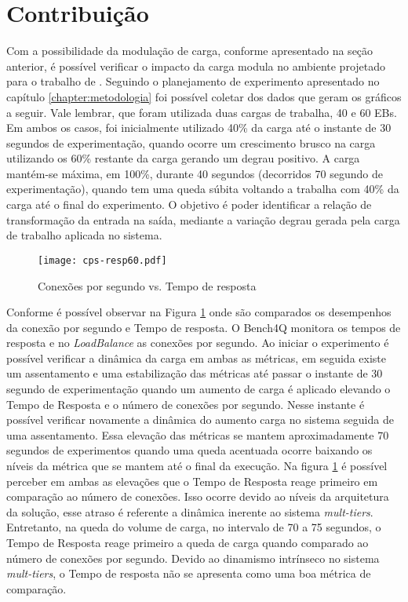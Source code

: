\section{Contribuição}
Com a possibilidade da modulação de carga, conforme apresentado na seção anterior, é possível verificar o impacto da carga modula no ambiente projetado para o trabalho de . Seguindo o planejamento de experimento apresentado no capítulo \ref{chapter:metodologia} foi possível coletar dos dados que geram os gráficos a seguir.
Vale lembrar, que foram utilizada duas cargas de trabalha, 40 e 60 EBs. Em ambos os casos, foi inicialmente utilizado 40\% da carga até o instante de 30 segundos de experimentação, quando ocorre um crescimento brusco na carga utilizando os 60\% restante da carga gerando um degrau positivo. A carga mantém-se máxima, em 100\%, durante 40 segundos (decorridos 70 segundo de experimentação), quando tem uma queda súbita voltando a trabalha com 40\% da carga até o final do experimento. O objetivo é poder identificar a relação de transformação da entrada na saída, mediante a variação degrau gerada pela carga de trabalho aplicada no sistema.

\begin{figure}[htb]
	\centering
	\texttt{[image: cps-resp60.pdf]}	
	\caption{Conexões por segundo vs. Tempo de resposta}
	\label{fig:cps-resp60}
	\fdadospesquisa
\end{figure}

Conforme é possível observar na Figura \ref{fig:cps-resp60} onde são comparados os desempenhos da conexão por segundo e Tempo de resposta. O Bench4Q monitora os tempos de resposta e no \textit{LoadBalance} as conexões por segundo. Ao iniciar o experimento é possível verificar a dinâmica da carga em ambas as métricas, em seguida existe um assentamento e uma estabilização das métricas até passar o instante de 30 segundo de experimentação quando um aumento de carga é aplicado elevando o Tempo de Resposta e o número de conexões por segundo. Nesse instante é possível verificar novamente a dinâmica do aumento carga no sistema seguida de uma assentamento. Essa elevação das métricas se mantem aproximadamente 70 segundos de experimentos quando uma queda acentuada ocorre baixando os níveis da métrica que se mantem até o final da execução. 
Na figura \ref{fig:cps-resp60} é possível perceber em ambas as elevações que o Tempo de Resposta reage primeiro em comparação ao número de conexões. Isso ocorre devido ao níveis da arquitetura da solução, esse atraso é referente a dinâmica inerente ao sistema \textit{mult-tiers}. Entretanto, na queda do volume de carga, no intervalo de 70 a 75 segundos, o Tempo de Resposta reage primeiro a queda de carga quando comparado ao número de conexões por segundo. Devido ao dinamismo intrínseco no sistema \textit{mult-tiers}, o Tempo de resposta não se apresenta como uma boa métrica de comparação. 

